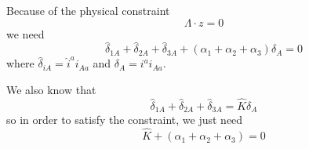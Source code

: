 \documentclass[12pt]{article}
\begin{document}
Because of the physical constraint
\begin{equation}
    \Lambda \cdot z =0
\end{equation}
we need 
\begin{equation}
    \hat{\delta}_{1A}+\hat{\delta}_{2A}+ \hat{\delta}_{3A}+(\alpha_1+\alpha_2+\alpha_3)\delta_A=0
\end{equation}
where $\hat{\delta}_{iA}=\hat{i}^ai_{Aa}$ and $\delta_A=i^a i_{Aa}$.

We also know that
\begin{equation}
    \hat{\delta}_{1A}+\hat{\delta}_{2A}+ \hat{\delta}_{3A}=\hat{K}\delta_A
\end{equation}
so in order to satisfy the constraint, we just need
\begin{equation}
    \hat{K}+(\alpha_1+\alpha_2+\alpha_3)=0
\end{equation}
\end{document}
